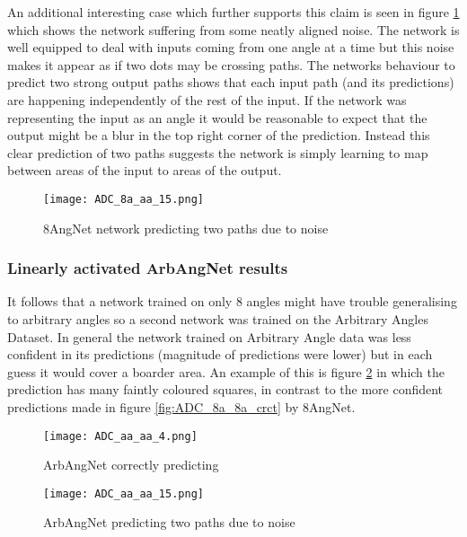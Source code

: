 An additional interesting case which further supports this claim is seen in figure \ref{fig:ADC_8aNoaa_special} which shows the network suffering from some neatly aligned noise. 
The network is well equipped to deal with inputs coming from one angle at a time but this noise makes it appear as if two dots may be crossing paths. 
The networks behaviour to predict two strong output paths shows that each input path (and its predictions) are happening independently of the rest of the input.
If the network was representing the input as an angle it would be reasonable to expect that the output might be a blur in the top right corner of the prediction.  
Instead this clear prediction of two paths suggests the network is simply learning to map between areas of the input to areas of the output. 

\begin{figure}
    \centering
    \texttt{[image: ADC\_8a\_aa\_15.png]}
    \caption{8AngNet network predicting two paths due to noise}
    \label{fig:ADC_8aNoaa_special}
\end{figure}


\subsubsection{Linearly activated ArbAngNet results}
It follows that a network trained on only 8 angles might have trouble generalising to arbitrary angles so a second network was trained on the Arbitrary Angles Dataset. 
In general the network trained on Arbitrary Angle data was less confident in its predictions (magnitude of predictions were lower) but in each guess it would cover a boarder area. 
An example of this is figure \ref{fig:ADC_aaaa_crct} in which the prediction has many faintly coloured squares, in contrast to the more confident predictions made in figure \ref{fig:ADC_8a_8a_crct} by 8AngNet.

\begin{figure}[h]
    \centering
    \texttt{[image: ADC\_aa\_aa\_4.png]}
    \caption{ArbAngNet correctly predicting}
    \label{fig:ADC_aaaa_crct}
\end{figure}


\begin{figure}[h]
    \centering
    \texttt{[image: ADC\_aa\_aa\_15.png]}
    \caption{ArbAngNet predicting two paths due to noise}
    \label{fig:ADC_aaaa_twopath}
\end{figure}

